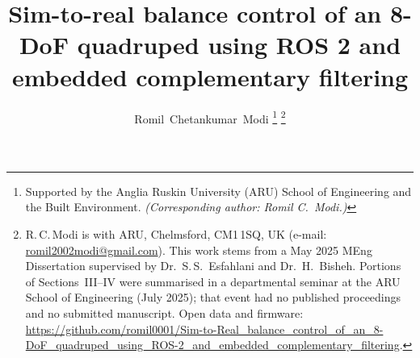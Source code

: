 \documentclass[journal]{IEEEtran}
\begin{document}
\title{Sim-to-real balance control of an 8-DoF quadruped using ROS 2 and embedded complementary filtering}
\author{Romil~Chetankumar~Modi%
\thanks{Supported by the Anglia Ruskin University (ARU) School of Engineering and the Built Environment. \emph{(Corresponding author: Romil C.~Modi.)}}%
\thanks{R.\,C.\,Modi is with ARU, Chelmsford, CM1\,1SQ, UK (e-mail: \href{mailto:romil2002modi@gmail.com}{romil2002modi@gmail.com}). This work stems from a May 2025 MEng Dissertation supervised by Dr.~S.\,S.~Esfahlani and Dr.~H.~Bisheh. Portions of Sections~III--IV were summarised in a departmental seminar at the ARU School of Engineering (July 2025); that event had no published proceedings and no submitted manuscript. Open data and firmware: \url{https://github.com/romil0001/Sim-to-Real_balance_control_of_an_8-DoF_quadruped_using_ROS-2_and_embedded_complementary_filtering}.}%
}
\maketitle
\end{document}
